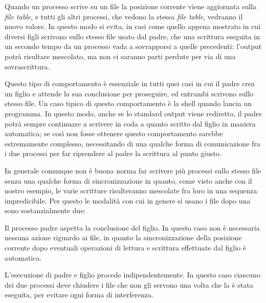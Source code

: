 Quando un processo scrive su un file la posizione corrente viene aggiornata
sulla \textit{file table}, e tutti gli altri processi, che vedono la stessa
\textit{file table}, vedranno il nuovo valore. In questo modo si evita, in
casi come quello appena mostrato in cui diversi figli scrivono sullo stesso
file usato dal padre, che una scrittura eseguita in un secondo tempo da un
processo vada a sovrapporsi a quelle precedenti: l'output potrà risultare
mescolato, ma non ci saranno parti perdute per via di una sovrascrittura.

Questo tipo di comportamento è essenziale in tutti quei casi in cui il padre
crea un figlio e attende la sua conclusione per proseguire, ed entrambi
scrivono sullo stesso file. Un caso tipico di questo comportamento è la shell
quando lancia un programma.  In questo modo, anche se lo standard output viene
rediretto, il padre potrà sempre continuare a scrivere in coda a quanto
scritto dal figlio in maniera automatica; se così non fosse ottenere questo
comportamento sarebbe estremamente complesso, necessitando di una qualche
forma di comunicazione fra i due processi per far riprendere al padre la
scrittura al punto giusto.

In generale comunque non è buona norma far scrivere più processi sullo stesso
file senza una qualche forma di sincronizzazione in quanto, come visto anche
con il nostro esempio, le varie scritture risulteranno mescolate fra loro in
una sequenza impredicibile. Per questo le modalità con cui in genere si usano
i file dopo una  sono sostanzialmente due:
\begin{enumerate*}
\item Il processo padre aspetta la conclusione del figlio. In questo caso non
  è necessaria nessuna azione riguardo ai file, in quanto la sincronizzazione
  della posizione corrente dopo eventuali operazioni di lettura e scrittura
  effettuate dal figlio è automatica.
\item L'esecuzione di padre e figlio procede indipendentemente. In questo caso
  ciascuno dei due processi deve chiudere i file che non gli servono una volta
  che la  è stata eseguita, per evitare ogni forma di interferenza.
\end{enumerate*}

